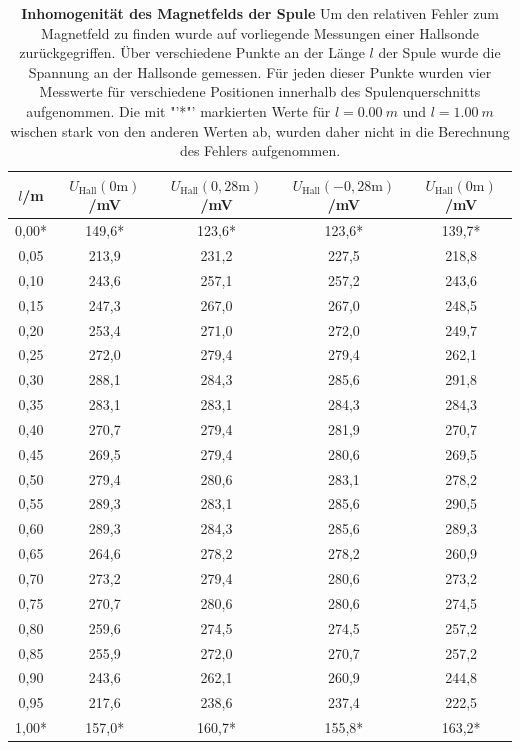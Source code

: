 \documentclass[a4paper,ngerman]{scrartcl}
\begin{document}
\begin{table}[tb!]
\centering
\caption[Inhomogenität des Magnetfelds der Spule]{\textbf{Inhomogenität des Magnetfelds der Spule} Um den relativen Fehler zum Magnetfeld zu finden wurde auf vorliegende Messungen einer Hallsonde zurückgegriffen. Über verschiedene Punkte an der Länge $l$ der Spule wurde die Spannung an der Hallsonde gemessen. Für jeden dieser Punkte wurden vier Messwerte für verschiedene Positionen innerhalb des Spulenquerschnitts aufgenommen. Die mit "'*"' markierten Werte für $l = \SI{0.00}{m}$ und $l = \SI{1.00}{m}$ wischen stark von den anderen Werten ab, wurden daher nicht in die Berechnung des Fehlers aufgenommen.}
\begin{tabular}{ccccc}
\toprule 
$l$/m	&	$U_{\mathrm{Hall}} (0 \mathrm{m})$/mV	&	$U_{\mathrm{Hall}} (0,28 \mathrm{m})$/mV	&	$U_{\mathrm{Hall}}(- 0,28 \mathrm{m})$/mV	&	$U_{\mathrm{Hall}} (0 \mathrm{m})$/mV	\\
\midrule
0,00* & 149,6* & 123,6* & 123,6* & 139,7* \\
0,05 & 213,9 & 231,2 & 227,5 & 218,8 \\
0,10 & 243,6 & 257,1 & 257,2 & 243,6 \\
0,15 & 247,3 & 267,0 & 267,0 & 248,5 \\
0,20 & 253,4 & 271,0 & 272,0 & 249,7 \\
0,25 & 272,0 & 279,4 & 279,4 & 262,1 \\
0,30 & 288,1 & 284,3 & 285,6 & 291,8 \\
0,35 & 283,1 & 283,1 & 284,3 & 284,3 \\
0,40 & 270,7 & 279,4 & 281,9 & 270,7 \\
0,45 & 269,5 & 279,4 & 280,6 & 269,5 \\
0,50 & 279,4 & 280,6 & 283,1 & 278,2 \\
0,55 & 289,3 & 283,1 & 285,6 & 290,5 \\
0,60 & 289,3 & 284,3 & 285,6 & 289,3 \\
0,65 & 264,6 & 278,2 & 278,2 & 260,9 \\
0,70 & 273,2 & 279,4 & 280,6 & 273,2 \\
0,75 & 270,7 & 280,6 & 280,6 & 274,5 \\
0,80 & 259,6 & 274,5 & 274,5 & 257,2 \\
0,85 & 255,9 & 272,0 & 270,7 & 257,2 \\
0,90 & 243,6 & 262,1 & 260,9 & 244,8 \\
0,95 & 217,6 & 238,6 & 237,4 & 222,5 \\
1,00* & 157,0* & 160,7* & 155,8* & 163,2* \\
\bottomrule
\end{tabular}
\label{tab:fieldinhomogenities}
\end{table}
\end{document}
